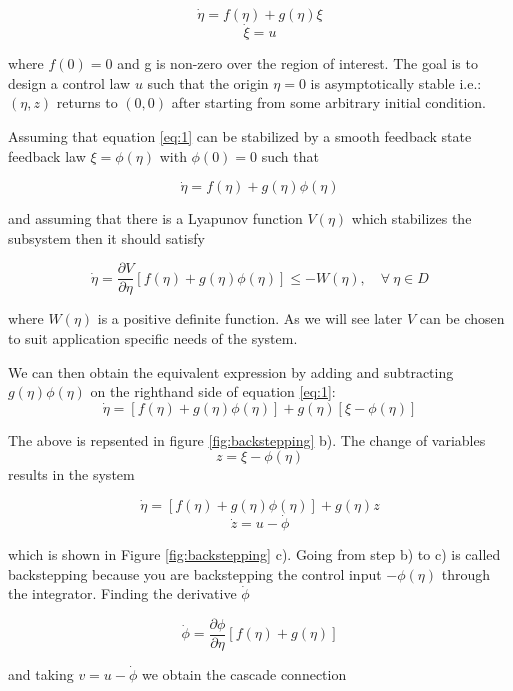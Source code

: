 \begin{equation}
    \dot{\eta} = f(\eta) + g(\eta)\xi \label{eq:1}
\end{equation}
\begin{equation}
    \dot{\xi} = u
\end{equation}

where $f(0)=0$ and g is non-zero over the region of interest.
The goal is to design a control law $u$ such that the origin $\eta=0$ is asymptotically stable i.e.: $(\eta, z)$ returns to $(0,0)$ after starting from some arbitrary initial condition.

Assuming that equation \ref{eq:1} can be stabilized by a smooth feedback state feedback law $\xi=\phi(\eta)$ with $\phi(0)=0$ such that 

$$
    \dot{\eta} = f(\eta) + g(\eta)\phi(\eta)
$$

and assuming that there is a Lyapunov function $V(\eta)$ which stabilizes the subsystem then it should satisfy

\begin{equation}
\dot{\eta} = \frac{\partial V}{\partial \eta}[f(\eta) + g(\eta)\phi(\eta)] \leq -W(\eta), \quad \forall \ \eta \in D
\end{equation}

where $W(\eta)$ is a positive definite function. As we will see later $V$ can be chosen to suit application specific needs of the system.

We can then obtain the equivalent expression by adding and subtracting $g(\eta)\phi(\eta)$ on the righthand side of equation \ref{eq:1}:
\begin{equation}
    \dot{\eta} = [f(\eta) + g(\eta)\phi(\eta)] + g(\eta)[\xi - \phi(\eta)] 
\end{equation}

The above is repsented in figure \ref{fig:backstepping} b). The change of variables 
$$ z = \xi - \phi(\eta) $$
results in the system 

$$ \dot{\eta} = [f(\eta) + g(\eta)\phi(\eta)] + g(\eta)z  $$
$$ \dot{z} = u - \dot{\phi} $$

which is shown in Figure \ref{fig:backstepping} c). Going from step b) to c) is called backstepping because you are backstepping the control input $-\phi(\eta)$ through the integrator. Finding the derivative $\dot{\phi}$ 

$$ \dot{\phi} = \frac{\partial \phi}{\partial \eta} [f(\eta) + g(\eta)] $$

and taking $v = u - \dot{\phi}$ we obtain the cascade connection

